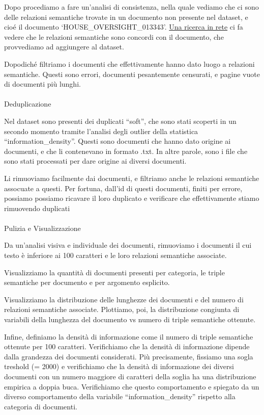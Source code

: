 \documentclass[
  italian,
  a4paper,
]{article}
\makeatletter
\let\oldparagraph\paragraph
\renewcommand{\paragraph}{
    \@ifstar
      \xxxParagraphStar
      \xxxParagraphNoStar
  }
\newcommand{\xxxParagraphStar}[1]{\oldparagraph*{#1}\mbox{}}
\newcommand{\xxxParagraphNoStar}[1]{\oldparagraph{#1}\mbox{}}
\makeatother
\begin{document}
Dopo procediamo a fare un'analisi di consistenza, nella quale vediamo
che ci sono delle relazioni semantiche trovate in un documento non
presente nel dataset, e cioé il documento `HOUSE\_OVERSIGHT\_013343'.
\href{https://epsteingraph.com/documents/HOUSE_OVERSIGHT_013343}{Una
ricerca in rete} ci fa vedere che le relazioni semantiche sono concordi
con il documento, che provvediamo ad aggiungere al dataset.

Dopodiché filtriamo i documenti che effettivamente hanno dato luogo a
relazioni semantiche. Questi sono errori, documenti pesantemente
censurati, e pagine vuote di documenti più lunghi.

\paragraph{Deduplicazione}\label{deduplicazione-1}

Nel dataset sono presenti dei duplicati ``soft'', che sono stati
scoperti in un secondo momento tramite l'analisi degli outlier della
statistica ``information\_density''. Questi sono documenti che hanno
dato origine ai documenti, e che li contenevano in formato .txt. In
altre parole, sono i file che sono stati processati per dare origine ai
diversi documenti.

Li rimuoviamo facilmente dai documenti, e filtriamo anche le relazioni
semantiche assocuate a questi. Per fortuna, dall'id di questi documenti,
finiti per errore, possiamo possiamo ricavare il loro duplicato e
verificare che effettivamente stiamo rimuovendo duplicati

\paragraph{Pulizia e Visualizzazione}\label{pulizia-e-visualizzazione}

Da un'analisi visiva e individuale dei documenti, rimuoviamo i documenti
il cui testo è inferiore ai 100 caratteri e le loro relazioni semantiche
associate.

Visualizziamo la quantità di documenti presenti per categoria, le triple
semantiche per documento e per argomento esplicito.

Visualizziamo la distribuzione delle lunghezze dei documenti e del
numero di relazioni semantiche associate. Plottiamo, poi, la
distribuzione congiunta di variabili della lunghezza del documento vs
numero di triple semantiche ottenute.

Infine, definiamo la densità di informazione come il numero di triple
semantiche ottenute per 100 caratteri. Verifichiamo che la densità di
informazione dipende dalla grandezza dei documenti considerati. Più
precisamente, fissiamo una sogla treshold (= 2000) e verifichiamo che la
densità di informazione dei diversi documenti con un numero maggiore di
caratteri della soglia ha una distribuzione empirica a doppia buca.
Verifichiamo che questo comportamento e spiegato da un diverso
comportamento della variabile ``information\_density'' rispetto alla
categoria di documenti.
\end{document}
